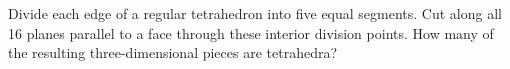 Divide each edge of a regular tetrahedron into five equal segments. Cut along all 16 planes parallel to a face through these interior division points. How many of the resulting three-dimensional pieces are tetrahedra?
